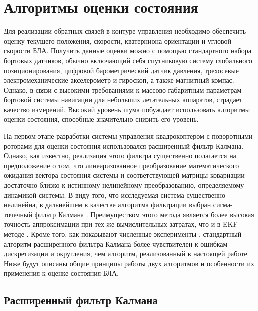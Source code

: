 
\chapter{Алгоритмы оценки состояния}
\label{chapter_estimation}

Для реализации обратных связей в контуре управления необходимо обеспечить оценку текущего положения, скорости, кватерниона ориентации и угловой скорости БЛА. Получить данные оценки можно с помощью стандартного набора бортовых датчиков, обычно включающий себя спутниковую систему глобального позиционирования, цифровой барометрический датчик давления, трехосевые электромеханические акселерометр и гироскоп, а также магнитный компас. Однако, в связи с высокими требованиями к массово-габаритным параметрам бортовой системы навигации для небольших летательных аппаратов, страдает качество измерений. Высокий уровень шума побуждает использовать алгоритмы оценки состояния, способные значительно снизить его уровень.

На первом этапе разработки системы управления квадрокоптером с поворотными роторами для оценки состояния использовался расширенный фильтр Калмана. Однако, как известно, реализация этого фильтра существенно полагается на предположение о том, что линеаризованное преобразование математического ожидания вектора состояния системы и соответствующей матрицы ковариации достаточно близко к истинному нелинейному преобразованию, определяемому динамикой системы. В виду того, что исследуемая система существенно нелинейна, в дальнейшем в качестве алгоритма фильтрации выбран сигма-точечный фильтр Калмана \cite{Julier01, Julier02}. Преимуществом этого метода является более высокая точность аппроксимации при тех же вычислительных затратах, что и в EKF-методе \cite{Kulikova01}. Кроме того, как показывают численные эксперименты \cite{Shavin01}, стандартный алгоритм расширенного фильтра Калмана более чувствителен к ошибкам дискретизации и округления, чем алгоритм, реализованный в настоящей работе. Ниже будут описаны общие принципы работы двух алгоритмов и особенности их применения к оценке состояния БЛА.

\section{Расширенный фильтр Калмана}

